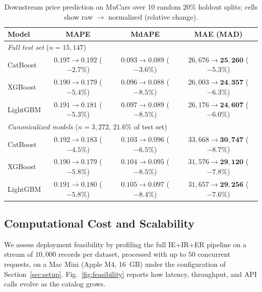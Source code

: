 \documentclass[conference]{IEEEtran}
\begin{document}
\begin{table}[htbp]
\caption{Downstream price prediction on MuCars over 10 random
$20\%$ holdout splits; cells show raw $\to$ normalized (relative
change).}
\begin{center}
\footnotesize
\setlength{\tabcolsep}{6pt}
\begin{tabular}{|l|c|c|c|}
\hline
\textbf{Model} & \textbf{MAPE} & \textbf{MdAPE} & \textbf{MAE} (MAD) \\
\hline
\multicolumn{4}{|l|}{\textit{Full test set} ($n = 15{,}147$)} \\
\hline
CatBoost & $0.197 \to \mathbf{0.192}$ ($-2.7\%$) & $0.093 \to \mathbf{0.089}$ ($-3.6\%$) & $26{,}676 \to \mathbf{25{,}260}$ ($-5.3\%$) \\
XGBoost  & $0.190 \to \mathbf{0.179}$ ($-5.4\%$) & $0.096 \to \mathbf{0.088}$ ($-8.5\%$) & $26{,}003 \to \mathbf{24{,}357}$ ($-6.3\%$) \\
LightGBM & $0.191 \to \mathbf{0.181}$ ($-5.3\%$) & $0.097 \to \mathbf{0.089}$ ($-8.5\%$) & $26{,}176 \to \mathbf{24{,}607}$ ($-6.0\%$) \\
\hline
\multicolumn{4}{|l|}{\textit{Canonicalized models} ($n = 3{,}272$, $21.6\%$ of test set)} \\
\hline
CatBoost & $0.192 \to \mathbf{0.183}$ ($-4.5\%$) & $0.103 \to \mathbf{0.096}$ ($-6.5\%$) & $33{,}668 \to \mathbf{30{,}747}$ ($-8.7\%$) \\
XGBoost  & $0.190 \to \mathbf{0.179}$ ($-5.8\%$) & $0.104 \to \mathbf{0.095}$ ($-8.5\%$) & $31{,}576 \to \mathbf{29{,}120}$ ($-7.8\%$) \\
LightGBM & $0.191 \to \mathbf{0.180}$ ($-5.8\%$) & $0.105 \to \mathbf{0.097}$ ($-8.4\%$) & $31{,}657 \to \mathbf{29{,}256}$ ($-7.6\%$) \\
\hline
\end{tabular}
\label{tab:downstream}
\end{center}
\end{table}

\subsection{Computational Cost and Scalability}
\label{sec:feasibility}

We assess deployment feasibility by profiling the full IE+IR+ER
pipeline on a stream of $10{,}000$ records per dataset, processed
with up to $50$ concurrent requests, on a Mac Mini
(Apple M4, 16~GB) under the configuration of
Section~\ref{sec:setup}. Fig.~\ref{fig:feasibility} reports how
latency, throughput, and API calls evolve as the catalog grows.
\end{document}

